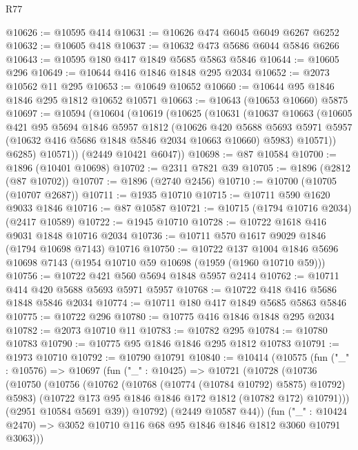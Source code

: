 \begin{lexlean}{R77}
\begin{coremodule}
@10626 := @10595 @414
@10631 := @10626 @474 @6045 @6049 @6267 @6252
@10632 := @10605 @418
@10637 := @10632 @473 @5686 @6044 @5846 @6266
@10643 := @10595 @180 @417 @1849 @5685 @5863 @5846
@10644 := @10605 @296
@10649 := @10644 @416 @1846 @1848 @295 @2034
@10652 := @2073 @10562 @11 @295
@10653 := @10649 @10652
@10660 := @10644 @95 @1846 @1846 @295 @1812 @10652 @10571
@10663 := @10643 (@10653 @10660) @5875
@10697 := @10594
    (@10604
      (@10619
        (@10625
          (@10631
            (@10637
              @10663
              (@10605
                @421
                @95
                @5694
                @1846
                @5957
                @1812
                (@10626
                  @420
                  @5688
                  @5693
                  @5971
                  @5957
                  (@10632 @416 @5686 @1848 @5846 @2034 @10663 @10660)
                  @5983)
                @10571))
            @6285)
          @10571))
      (@2449 @10421 @6047))
@10698 := @87 @10584
@10700 := @1896 (@10401 @10698)
@10702 := @2311 @7821 @39
@10705 := @1896 (@2812 (@87 @10702))
@10707 := @1896 (@2740 @2456)
@10710 := @10700 (@10705 (@10707 @2687))
@10711 := @1935 @10710
@10715 := @10711 @590 @1620 @9033 @1846
@10716 := @87 @10587
@10721 := @10715 (@1794 @10716 @2034) (@2417 @10589)
@10722 := @1945 @10710
@10728 := @10722 @1618 @416 @9031 @1848 @10716 @2034
@10736 := @10711 @570 @1617 @9029 @1846 (@1794 @10698 @7143) @10716
@10750 := @10722
    @137
    @1004
    @1846
    @5696
    @10698
    @7143
    (@1954 @10710 @59 @10698 (@1959 (@1960 @10710 @59)))
@10756 := @10722 @421 @560 @5694 @1848 @5957 @2414
@10762 := @10711 @414 @420 @5688 @5693 @5971 @5957
@10768 := @10722 @418 @416 @5686 @1848 @5846 @2034
@10774 := @10711 @180 @417 @1849 @5685 @5863 @5846
@10775 := @10722 @296
@10780 := @10775 @416 @1846 @1848 @295 @2034
@10782 := @2073 @10710 @11
@10783 := @10782 @295
@10784 := @10780 @10783
@10790 := @10775 @95 @1846 @1846 @295 @1812 @10783
@10791 := @1973 @10710
@10792 := @10790 @10791
@10840 := @10414
    (@10575
      (fun ("_" : @10576) =>
      @10697
        (fun ("_" : @10425) =>
        @10721
          (@10728
            (@10736
              (@10750
                (@10756
                  (@10762 (@10768 (@10774 (@10784 @10792) @5875) @10792) @5983)
                  (@10722 @173 @95 @1846 @1846 @172 @1812 (@10782 @172) @10791)))
              (@2951 @10584 @5691 @39))
            @10792)
          (@2449 @10587 @44))
        (fun ("_" : @10424 @2470) =>
        @3052 @10710 @116 @68 @95 @1846 @1846 @1812 @3060 @10791 @3063)))

\end{coremodule}
\end{lexlean}
